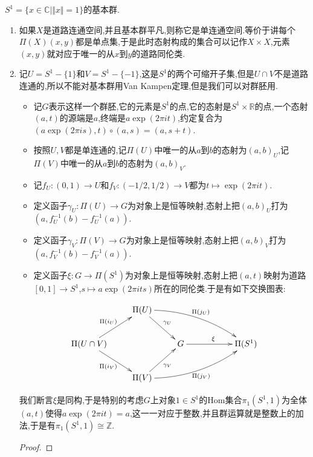 $S^1=\{x\in\mathbb{C}\mid\Vert x\Vert=1\}$的基本群.
\begin{enumerate}
	\item 如果$X$是道路连通空间,并且基本群平凡,则称它是单连通空间.等价于讲每个$\Pi(X)(x,y)$都是单点集,于是此时态射构成的集合可以记作$X\times X$,元素$(x,y)$就对应于唯一的从$x$到$y$的道路同伦类.
	\item 记$U=S^1-\{1\}$和$V=S^1-\{-1\}$,这是$S^1$的两个可缩开子集,但是$U\cap V$不是道路连通的,所以不能对基本群用Van Kampen定理,但是我们可以对群胚用.
	\begin{itemize}
		\item 记$G$表示这样一个群胚,它的元素是$S^1$的点,它的态射是$S^1\times\mathbb{R}$的点,一个态射$(a,t)$的源端是$a$,终端是$a\exp(2\pi it)$,约定复合为$(a\exp(2\pi is),t)\circ(a,s)=(a,s+t)$.
		\item 按照$U,V$都是单连通的,记$\Pi(U)$中唯一的从$a$到$b$的态射为$(a,b)_U$,记$\Pi(V)$中唯一的从$a$到$b$的态射为$(a,b)_V$.
		\item 记$f_U:(0,1)\to U$和$f_V:(-1/2,1/2)\to V$都为$t\mapsto\exp(2\pi it)$.
		\item 定义函子$\gamma_U:\Pi(U)\to G$为对象上是恒等映射,态射上把$(a,b)_U$打为$(a,f_U^{-1}(b)-f_U^{-1}(a))$.
		\item 定义函子$\gamma_V:\Pi(V)\to G$为对象上是恒等映射,态射上把$(a,b)_V$打为$(a,f_V^{-1}(b)-f^{-1}_V(a))$.
		\item 定义函子$\xi:G\to\Pi(S^1)$为对象上是恒等映射,态射上把$(a,t)$映射为道路$[0,1]\to S^1$,$s\mapsto a\exp(2\pi its)$所在的同伦类.于是有如下交换图表:
	\end{itemize}
	$$\xymatrix{&\Pi(U)\ar@/^1pc/[drrr]^{\Pi(j_U)}\ar[dr]^{\gamma_U}&&&\\\Pi(U\cap V)\ar[ur]^{\Pi(i_U)}\ar[dr]_{\Pi(i_V)}&&G\ar[rr]^{\xi}&&\Pi(S^1)\\&\Pi(V)\ar[ur]_{\gamma_V}\ar@/_1pc/[urrr]_{\Pi(j_V)}&&&}$$
	
	我们断言$\xi$是同构,于是特别的考虑$G$上对象$1\in S^1$的Hom集合$\pi_1(S^1,1)$为全体$(a,t)$使得$a\exp(2\pi it)=a$,这一一对应于整数,并且群运算就是整数上的加法,于是有$\pi_1(S^1,1)\cong\mathbb{Z}$.
	\begin{proof}
		

\end{proof}
\end{enumerate}
